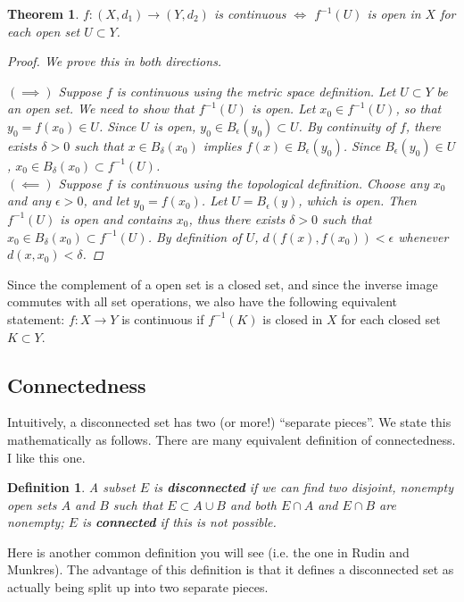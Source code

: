 \documentclass[12pt]{amsart}         %
\newtheorem{definition}{Definition}[section]
\newtheorem{theorem}{Theorem}[section]
\theoremstyle{remark}
\begin{document}
\begin{theorem}
$f: (X, d_1) \rightarrow (Y, d_2)$ is continuous $\iff$ $f^{-1}(U)$ is open in $X$ for each open set $U \subset Y$.
\begin{proof}We prove this in both directions.

\indent $(\implies)$ Suppose $f$ is continuous using the metric space definition. Let $U \subset Y$ be an open set. We need to show that $f^{-1}(U)$ is open. Let $x_0 \in f^{-1}(U)$, so that $y_0 = f(x_0) \in U$. Since $U$ is open, $y_0 \in B_\epsilon(y_0) \subset U$. By continuity of $f$, there exists $\delta > 0$ such that $x \in B_\delta(x_0)$ implies $f(x) \in B_\epsilon(y_0)$. Since $B_\epsilon(y_0) \in U$, $x_0 \in B_\delta(x_0) \subset f^{-1}(U)$.\\

\indent $(\impliedby)$ Suppose $f$ is continuous using the topological definition. Choose any $x_0$ and any $\epsilon > 0$, and let $y_0 = f(x_0)$. Let $U = B_\epsilon(y)$, which is open. Then $f^{-1}(U)$ is open and contains $x_0$, thus there exists $\delta > 0$ such that $x_0 \in B_\delta(x_0) \subset f^{-1}(U)$. By definition of $U$, $d(f(x), f(x_0)) < \epsilon$ whenever $d(x, x_0) < \delta$.
\end{proof}
\end{theorem}

Since the complement of a open set is a closed set, and since the inverse image commutes with all set operations, we also have the following equivalent statement: $f: X \rightarrow Y$ is continuous if $f^{-1}(K)$ is closed in $X$ for each closed set $K \subset Y$.

\subsection{Connectedness}

Intuitively, a disconnected set has two (or more!) ``separate pieces''. We state this mathematically as follows. There are many equivalent definition of connectedness. I like this one.

\begin{definition}
A subset $E$ is \textbf{disconnected} if we can find two disjoint, nonempty open sets $A$ and $B$ such that $E \subset A \cup B$ and both $E \cap A$ and $E \cap B$ are nonempty; $E$ is \textbf{connected} if this is not possible.
\end{definition}

Here is another common definition you will see (i.e. the one in Rudin and Munkres). The advantage of this definition is that it defines a disconnected set as actually being split up into two separate pieces. 
\end{document}
